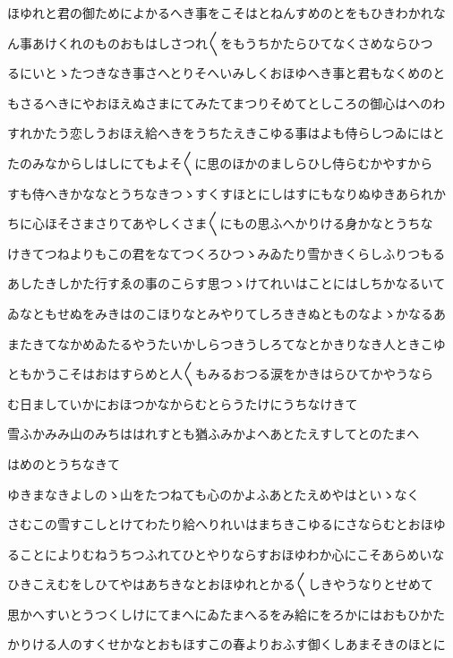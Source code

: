 \documentclass[a4paper,11pt,landscape]{ltjtarticle}
\begin{document}
ほゆれと君の御ためによかるへき事をこそはとねんすめのとをもひきわかれな
\par\medskip
ん事あけくれのものおもはしさつれ〱をもうちかたらひてなくさめならひつ
\par\medskip
るにいとゝたつきなき事さへとりそへいみしくおほゆへき事と君もなくめのと
\par\medskip
もさるへきにやおほえぬさまにてみたてまつりそめてとしころの御心はへのわ
\par\medskip
すれかたう恋しうおほえ給へきをうちたえきこゆる事はよも侍らしつゐにはと
\par\medskip
たのみなからしはしにてもよそ〱に思のほかのましらひし侍らむかやすから
\par\medskip
すも侍へきかななとうちなきつゝすくすほとにしはすにもなりぬゆきあられか
\par\medskip
ちに心ほそさまさりてあやしくさま〱にもの思ふへかりける身かなとうちな
\par\medskip
けきてつねよりもこの君をなてつくろひつゝみゐたり雪かきくらしふりつもる
\par\medskip
あしたきしかた行すゑの事のこらす思つゝけてれいはことにはしちかなるいて
\par\medskip
ゐなともせぬをみきはのこほりなとみやりてしろききぬとものなよゝかなるあ
\par\medskip
またきてなかめゐたるやうたいかしらつきうしろてなとかきりなき人ときこゆ
\par\medskip
ともかうこそはおはすらめと人〱もみるおつる涙をかきはらひてかやうなら
\par\medskip
む日ましていかにおほつかなからむとらうたけにうちなけきて
\par\medskip
雪ふかみみ山のみちははれすとも猶ふみかよへあとたえすしてとのたまへ
\par\medskip
はめのとうちなきて
\par\medskip
ゆきまなきよしのゝ山をたつねても心のかよふあとたえめやはといゝなく
\par\medskip
さむこの雪すこしとけてわたり給へりれいはまちきこゆるにさならむとおほゆ
\par\medskip
ることによりむねうちつふれてひとやりならすおほゆわか心にこそあらめいな
\par\medskip
ひきこえむをしひてやはあちきなとおほゆれとかる〱しきやうなりとせめて
\par\medskip
思かへすいとうつくしけにてまへにゐたまへるをみ給にをろかにはおもひかた
\par\medskip
かりける人のすくせかなとおもほすこの春よりおふす御くしあまそきのほとに
\par\medskip
\end{document}
